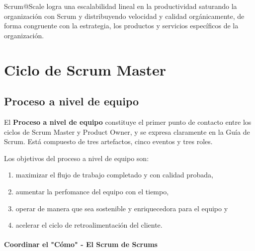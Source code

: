 \documentclass{article} %
\begin{document}
\noindent 

\noindent Scrum@Scale logra una escalabilidad lineal en la productividad saturando la organizaci\'{o}n con Scrum y distribuyendo velocidad y calidad org\'{a}nicamente, de forma congruente con la estrategia, los productos y servicios espec\'{i}ficos de la organizaci\'{o}n. 

\noindent 

\noindent 
\section{\eject }

\noindent 
\section{Ciclo de Scrum Master}

\noindent 
\subsection{Proceso a nivel de equipo}

\noindent 

\noindent El \textbf{Proceso a nivel de equipo} constituye el primer punto de contacto entre los ciclos de Scrum Master y Product Owner, y se expresa claramente en la Gu\'{i}a de Scrum. Est\'{a} compuesto de tres artefactos, cinco eventos y tres roles.

\noindent 

\noindent Los objetivos del proceso a nivel de equipo son:

\begin{enumerate}
\item  maximizar el flujo de trabajo completado y con calidad probada,

\item  aumentar la perfomance del equipo con el tiempo,

\item  operar de manera que sea sostenible y enriquecedora para el equipo y

\item  acelerar el ciclo de retroalimentaci\'{o}n\textit{ }del cliente.
\end{enumerate}

\noindent 
\paragraph{Coordinar el "C\'{o}mo" - El Scrum de Scrums}
\end{document}
